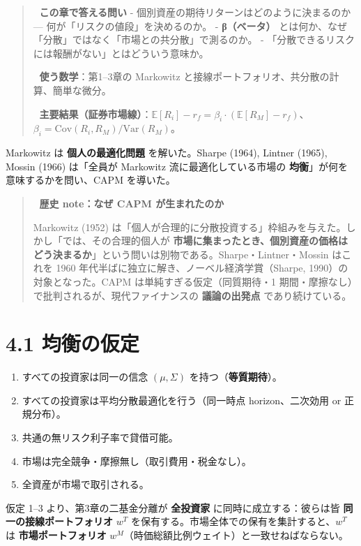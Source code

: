 \documentclass[11pt,a4paper]{report}
\begin{document}
\begin{quote}
🎯 \textbf{この章で答える問い}
- 個別資産の期待リターンはどのように決まるのか — 何が「リスクの値段」を決めるのか。
- \textbf{β（ベータ）} とは何か、なぜ「分散」ではなく「市場との共分散」で測るのか。
- 「分散できるリスクには報酬がない」とはどういう意味か。

📐 \textbf{使う数学}：第1–3章の Markowitz と接線ポートフォリオ、共分散の計算、簡単な微分。

🔑 \textbf{主要結果（証券市場線）}：$\mathbb{E}[R_i] - r_f = \beta_i \cdot (\mathbb{E}[R_M] - r_f)$、$\beta_i = \mathrm{Cov}(R_i, R_M) / \mathrm{Var}(R_M)$。
\end{quote}

Markowitz は \textbf{個人の最適化問題} を解いた。Sharpe (1964), Lintner (1965), Mossin (1966) は「全員が Markowitz 流に最適化している市場の \textbf{均衡}」が何を意味するかを問い、CAPM を導いた。

\begin{quote}
📜 \textbf{歴史 note：なぜ CAPM が生まれたのか}

Markowitz (1952) は「個人が合理的に分散投資する」枠組みを与えた。しかし「では、その合理的個人が \textbf{市場に集まったとき、個別資産の価格はどう決まるか}」という問いは別物である。Sharpe・Lintner・Mossin はこれを 1960 年代半ばに独立に解き、ノーベル経済学賞（Sharpe, 1990）の対象となった。CAPM は単純すぎる仮定（同質期待・1 期間・摩擦なし）で批判されるが、現代ファイナンスの \textbf{議論の出発点} であり続けている。
\end{quote}

\section{4.1 均衡の仮定}

\begin{enumerate}
\item すべての投資家は同一の信念 $(\mu, \Sigma)$ を持つ（\textbf{等質期待}）。
\item すべての投資家は平均分散最適化を行う（同一時点 horizon、二次効用 or 正規分布）。
\item 共通の無リスク利子率で貸借可能。
\item 市場は完全競争・摩擦無し（取引費用・税金なし）。
\item 全資産が市場で取引される。
\end{enumerate}

仮定 1–3 より、第3章の二基金分離が \textbf{全投資家} に同時に成立する：彼らは皆 \textbf{同一の接線ポートフォリオ} $w^T$ を保有する。市場全体での保有を集計すると、$w^T$ は \textbf{市場ポートフォリオ} $w^M$（時価総額比例ウェイト）と一致せねばならない。
\end{document}
